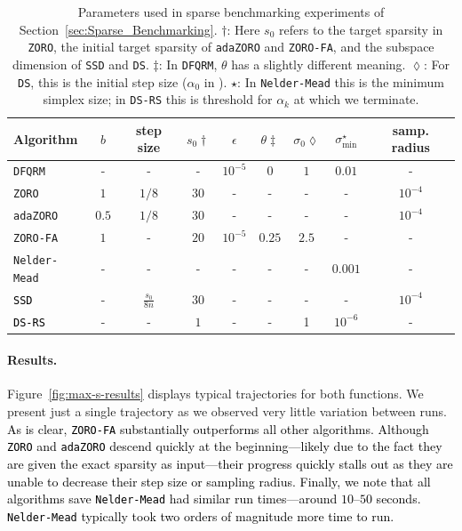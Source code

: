 \begin{table}[!]
\def\ROWCOLOR{black!10!white}
\centering
    \begin{tabular}{l c c c c c c c c}
    \toprule
       Algorithm & $b$ & step size & $s_0\dagger$ & $\epsilon$ & $\theta\ddagger$ &  $\sigma_0\lozenge$ & $\sigma_{\min}^\star$ & samp. radius \\
    \midrule
    \rowcolor{\ROWCOLOR}
    {\tt DFQRM} & - & - & - & $10^{-5}$ & $0$ & $1$ & $0.01$  & - \\
    {\tt ZORO} & $1$ & $1/8$ & $30$ & - & - & - & - & $10^{-4}$ \\
    \rowcolor{\ROWCOLOR}
    {\tt adaZORO} & $0.5$ & $1/8$ & $30$ & - & - & - & - & $10^{-4}$ \\
    {\tt ZORO-FA} & $1$ & - & $20$ & $10^{-5}$ & $0.25$ & $2.5$ & - & - \\
    \rowcolor{\ROWCOLOR}
    {\tt Nelder-Mead} & - & - & - & - & - & - & $0.001$ & -\\
    \textcolor{black}{{\tt SSD}} & - & $\frac{s_0}{8n}$ & $30$ & - & - & - & - & $10^{-4}$ \\
    \rowcolor{\ROWCOLOR}
    \textcolor{black}{{\tt DS-RS}} & - & - & $1$ & - & - & 1 & $10^{-6}$ & - \\
    \bottomrule
    \end{tabular}
    \caption{Parameters used in sparse benchmarking experiments of Section~\ref{sec:Sparse_Benchmarking}. $\dagger$: Here $s_0$ refers to the target sparsity in {\tt ZORO}, the initial target sparsity of {\tt adaZORO} and {\tt ZORO-FA}, and the subspace dimension of {\tt SSD} and {\tt DS}. $\ddagger$: In {\tt DFQRM}, $\theta$ has a slightly different meaning. $\lozenge$: For {\tt DS}, this is the initial step size ($\alpha_0$ in \cite{Roberts}). $\star$: In {\tt Nelder-Mead} this is the minimum simplex size; in {\tt DS-RS} this is threshold for $\alpha_k$ at which we terminate.}
    \label{table: params_sparse_benchmarking}
\end{table}


\paragraph{Results.} Figure~\ref{fig:max-s-results} displays typical trajectories for both functions. We present just a single trajectory as we observed very little variation between runs. \textcolor{black}{As is clear, {\tt ZORO-FA} substantially outperforms all other algorithms. Although {\tt ZORO} and {\tt adaZORO} descend quickly at the beginning---likely due to the fact they are given the exact sparsity as input---their progress quickly stalls out as they are unable to decrease their step size or sampling radius. Finally, we note that all algorithms save {\tt Nelder-Mead} had similar run times---around $10$--$50$ seconds. {\tt Nelder-Mead} typically took two orders of magnitude more time to run.}


